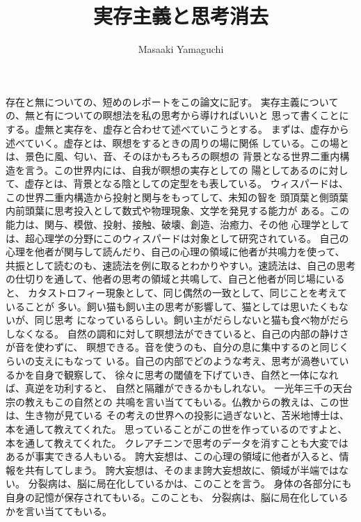 \documentclass{jsarticle}
\begin{document}
\title{実存主義と思考消去}
\author{Masaaki Yamaguchi}
\date{}
\maketitle
  
   存在と無についての、短めのレポートをこの論文に記す。
   実存主義についての、無と有についての瞑想法を私の思考から導ければいいと
   思って書くことにする。虚無と実存を、虚存と合わせて述べていこうとする。
   まずは、虚存から述べていく。虚存とは、瞑想をするときの周りの場に関係
   している。この場とは、景色に風、匂い、音、そのほかもろもろの瞑想の
   背景となる世界二重内構造を言う。この世界内には、自我が瞑想の実存としての
   陽としてあるのに対して、虚存とは、背景となる陰としての定型をも表している。
   ウィスパードは、この世界二重内構造から投射と関与をもってして、未知の智を
   頭頂葉と側頭葉内前頭葉に思考投入として数式や物理現象、文学を発見する能力が
   ある。この能力は、関与、模倣、投射、接触、破壊、創造、治癒力、その他
   心理学としては、超心理学の分野にこのウィスパードは対象として研究されている。
   自己の心理を他者が関与して読んだり、自己の心理の領域に他者が共鳴力を使って、
   共振として読むのも、速読法を例に取るとわかりやすい。速読法は、自己の思考
   の仕切りを通して、他者の思考の領域と共鳴して、自己と他者が同じ場にいると、
   カタストロフィー現象として、同じ偶然の一致として、同じことを考えていることが
   多い。飼い猫も飼い主の思考が影響して、猫としては思いたくもないが、同じ思考
   になっているらしい。飼い主がだらしないと猫も食べ物がだらしなくなる。
   自然の調和に対して瞑想法ができていると、自己の内部の静けさが音を使わずに、
   瞑想できる。音を使うのも、自分の息に集中するのと同じくらいの支えにもなって
   いる。自己の内部でどのような考え、思考が渦巻いているかを自身で観察して、
   徐々に思考の閾値を下げていき、自然と一体になれば、真逆を功利すると、
   自然と隔離ができるかもしれない。
   一光年三千の天台宗の教えもこの自然との
   共鳴を言い当ててもいる。仏教からの教えは、この世は、生き物が見ている
   その考えの世界への投影に過ぎないと、苫米地博士は、本を通して教えてくれた。
   思っていることがこの世を作っているのですよと、本を通して教えてくれた。
   クレアチニンで思考のデータを消すことも大変ではあるが事実できる人もいる。
   誇大妄想は、この心理の領域に他者が入ると、情報を共有してしまう。
   誇大妄想は、そのまま誇大妄想故に、領域が半端ではない。
   分裂病は、脳に局在化しているかは、このことを言う。
   身体の各部分にも自身の記憶が保存されてもいる。このことも、
   分裂病は、脳に局在化しているかを言い当ててもいる。
\end{document}
